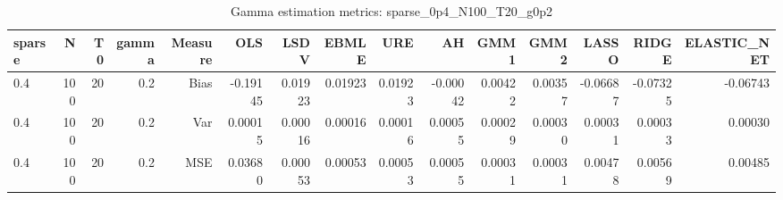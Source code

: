 \begin{table}[!htbp]\centering
\caption{Gamma estimation metrics: sparse_0p4_N100_T20_g0p2}
\label{tab:table1_sparse_0p4_N100_T20_g0p2}
\begin{tabular}{lrrrrrrrrrrrrrr}
\hline
sparse & N & T0 & gamma & Measure & OLS & LSDV & EBMLE & URE & AH & GMM1 & GMM2 & LASSO & RIDGE & ELASTIC_NET \\
\hline
0.4 & 100 & 20 & 0.2 & Bias & -0.19145 & 0.01923 & 0.01923 & 0.01923 & -0.00042 & 0.00422 & 0.00357 & -0.06687 & -0.07325 & -0.06743 \\
0.4 & 100 & 20 & 0.2 & Var & 0.00015 & 0.00016 & 0.00016 & 0.00016 & 0.00055 & 0.00029 & 0.00030 & 0.00031 & 0.00033 & 0.00030 \\
0.4 & 100 & 20 & 0.2 & MSE & 0.03680 & 0.00053 & 0.00053 & 0.00053 & 0.00055 & 0.00031 & 0.00031 & 0.00478 & 0.00569 & 0.00485 \\
\hline
\end{tabular}
\end{table}

